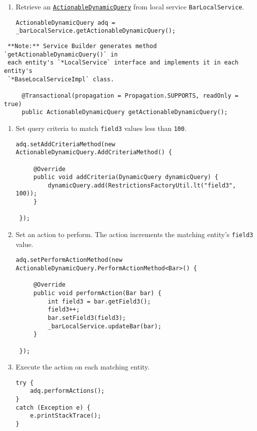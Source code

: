 \begin{enumerate}
\def\labelenumi{\arabic{enumi}.}
\item
  Retrieve an
  \href{https://docs.liferay.com/dxp/portal/7.2-latest/javadocs/portal-kernel/com/liferay/portal/kernel/dao/orm/ActionableDynamicQuery.html}{\texttt{ActionableDynamicQuery}}
  from local service \texttt{BarLocalService}.

\begin{verbatim}
ActionableDynamicQuery adq = _barLocalService.getActionableDynamicQuery();
\end{verbatim}
\end{enumerate}

\noindent\hrulefill

\begin{verbatim}
 **Note:** Service Builder generates method `getActionableDynamicQuery()` in
 each entity's `*LocalService` interface and implements it in each entity's
 `*BaseLocalServiceImpl` class.
 
     @Transactional(propagation = Propagation.SUPPORTS, readOnly = true)
     public ActionableDynamicQuery getActionableDynamicQuery();
\end{verbatim}

\noindent\hrulefill

\begin{enumerate}
\def\labelenumi{\arabic{enumi}.}
\setcounter{enumi}{1}
\item
  Set query criteria to match \texttt{field3} values less than
  \texttt{100}.

\begin{verbatim}
adq.setAddCriteriaMethod(new ActionableDynamicQuery.AddCriteriaMethod() {

     @Override
     public void addCriteria(DynamicQuery dynamicQuery) {
         dynamicQuery.add(RestrictionsFactoryUtil.lt("field3", 100));
     }

 });
\end{verbatim}
\item
  Set an action to perform. The action increments the matching entity's
  \texttt{field3} value.

\begin{verbatim}
adq.setPerformActionMethod(new ActionableDynamicQuery.PerformActionMethod<Bar>() {

     @Override
     public void performAction(Bar bar) {
         int field3 = bar.getField3();
         field3++;
         bar.setField3(field3);
         _barLocalService.updateBar(bar);
     }

 });
\end{verbatim}
\item
  Execute the action on each matching entity.

\begin{verbatim}
try {
    adq.performActions();
}
catch (Exception e) {
    e.printStackTrace();
}
\end{verbatim}
\end{enumerate}

